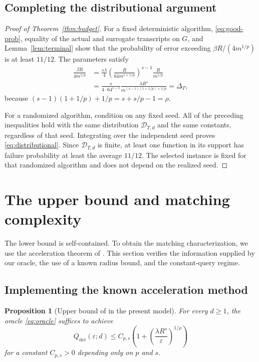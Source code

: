 \documentclass[11pt]{article}
\newtheorem{proposition}[theorem]{Proposition}
\theoremstyle{definition}
\theoremstyle{remark}
\newcommand{\eps}{\varepsilon}
\newcommand{\D}{\mathcal D}
\newcommand{\Qdet}{Q_{\mathrm{det}}}
\begin{document}
\subsection{Completing the distributional argument}

\begin{proof}[Proof of Theorem~\ref{thm:budget}]
For a fixed deterministic algorithm, \eqref{eq:good-prob}, equality of the
actual and surrogate transcripts on $G$, and
Lemma~\ref{lem:terminal} show that the probability of error exceeding
$\beta R/(4m^{1/p})$ is at least $11/12$. The parameters satisfy
\begin{align*}
\frac{\beta R}{4m^{1/p}}
&=\frac{s\lambda}{4}
\left(\frac{R}{64m^{1+1/p}}\right)^{s-1}
\frac{R}{m^{1/p}}\\
&=\frac{s}{4\cdot64^{s-1}}
\frac{\lambda R^s}{m^{(s-1)(1+1/p)+1/p}}
=\Delta_T,
\end{align*}
because $(s-1)(1+1/p)+1/p=s+s/p-1=\rho$.

For a randomized algorithm, condition on any fixed seed. All of the preceding
inequalities hold with the same distribution $\D_{T,d}$ and the same constants,
regardless of that seed. Integrating over the independent seed proves
\eqref{eq:distributional}. Since $\D_{T,d}$ is finite, at least one function
in its support has failure probability at least the average $11/12$. The selected instance is fixed for that randomized algorithm and does
not depend on the realized seed.
\end{proof}

\section{The upper bound and matching complexity}\label{sec:upper}

The lower bound is self-contained. To obtain the matching characterization,
we use the acceleration theorem of \citet{ABJS}. This section verifies
the information supplied by our oracle, the use of a known radius bound,
and the constant-query regime.

\subsection{Implementing the known acceleration method}

\begin{proposition}[Upper bound of \citet{ABJS} in the present model]
\label{prop:upper}
For every $d\ge1$, the oracle \eqref{eq:oracle} suffices to achieve
\begin{equation}\label{eq:upper}
\Qdet(\eps;d)
\le C_{p,s}\left(1+\left(\frac{\lambda R^s}{\eps}\right)^{1/\rho}\right)
\end{equation}
for a constant $C_{p,s}>0$ depending only on $p$ and $s$.
\end{proposition}
\end{document}
